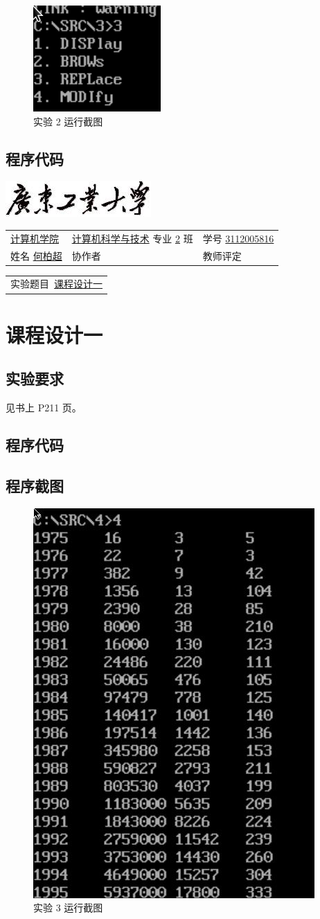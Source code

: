 \documentclass[a4paper,12pt]{article}
\newcommand{\labtitle}[1] {
    \centerline{\includegraphics[scale=0.5]{resource/chapter-caption}}

    \begin{tabular}{ l l l }
        \\  %
        \underline{\hspace{3pt} 计算机学院 \hspace{3pt}} &
            \underline{计算机科学与技术} 专业 \underline{2} 班 &
            学号 \underline{3112005816} \\[3pt]

        姓名 \underline{\hspace{3pt} 何柏超 \hspace{3pt}} &
            协作者 \underline{\hspace{50pt}} &
            教师评定 \underline{\hspace{35pt}} \\[3pt]
    \end{tabular}

    \begin{tabular}{l}
    实验题目\ \underline{#1} \\[3pt]
    \end{tabular}
    \section{#1}
}
\begin{document}
\begin{figure}[h!]
    \caption{实验 2 运行截图}
    \centering
        \includegraphics[scale=1]{src/3}
\end{figure}

\subsection{程序代码}



\clearpage


\labtitle{课程设计一}

\subsection{实验要求}

见书上 P211 页。

\subsection{程序代码}



\subsection{程序截图}

\begin{figure}[h!]
    \caption{实验 3 运行截图}
    \centering
        \includegraphics[scale=1]{src/4}
\end{figure}


\clearpage
\end{document}
